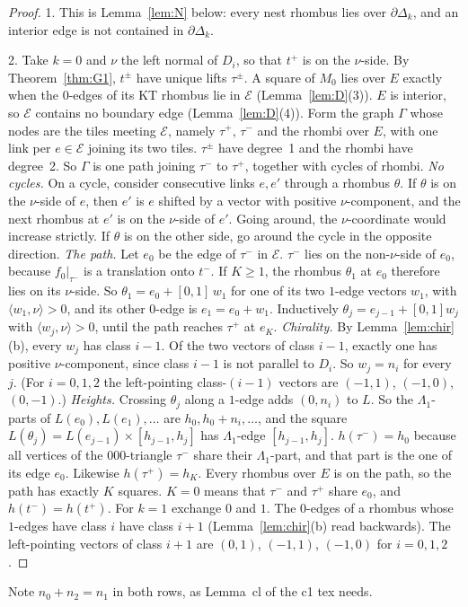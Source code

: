 \documentclass[11pt]{article}
\theoremstyle{definition}\newtheorem{definition}[theorem]{Definition}\newtheorem{remark}[theorem]{Remark}
\begin{document}
\begin{proof}
1. This is Lemma~\ref{lem:N} below: every nest rhombus lies over $\partial\Delta_k$, and an interior edge is not contained in $\partial\Delta_k$.

2. Take $k=0$ and $\nu$ the left normal of $D_i$, so that $t^+$ is on the $\nu$-side. By Theorem~\ref{thm:G1}, $t^\pm$ have unique lifts $\tau^\pm$. A square of $M_0$ lies over $E$ exactly when the $0$-edges of its KT rhombus lie in $\mathcal E$ (Lemma~\ref{lem:D}(3)). $E$ is interior, so $\mathcal E$ contains no boundary edge (Lemma~\ref{lem:D}(4)). Form the graph $\Gamma$ whose nodes are the tiles meeting $\mathcal E$, namely $\tau^+$, $\tau^-$ and the rhombi over $E$, with one link per $e\in\mathcal E$ joining its two tiles. $\tau^\pm$ have degree~1 and the rhombi have degree~2. So $\Gamma$ is one path joining $\tau^-$ to $\tau^+$, together with cycles of rhombi.
\emph{No cycles.} On a cycle, consider consecutive links $e,e'$ through a rhombus $\theta$. If $\theta$ is on the $\nu$-side of $e$, then $e'$ is $e$ shifted by a vector with positive $\nu$-component, and the next rhombus at $e'$ is on the $\nu$-side of $e'$. Going around, the $\nu$-coordinate would increase strictly. If $\theta$ is on the other side, go around the cycle in the opposite direction.
\emph{The path.} Let $e_0$ be the edge of $\tau^-$ in $\mathcal E$. $\tau^-$ lies on the non-$\nu$-side of $e_0$, because $f_0|_{\tau^-}$ is a translation onto $t^-$. If $K\ge1$, the rhombus $\theta_1$ at $e_0$ therefore lies on its $\nu$-side. So $\theta_1=e_0+[0,1]\,w_1$ for one of its two $1$-edge vectors $w_1$, with $\langle w_1,\nu\rangle>0$, and its other $0$-edge is $e_1=e_0+w_1$. Inductively $\theta_j=e_{j-1}+[0,1]w_j$ with $\langle w_j,\nu\rangle>0$, until the path reaches $\tau^+$ at $e_K$.
\emph{Chirality.} By Lemma~\ref{lem:chir}(b), every $w_j$ has class $i-1$. Of the two vectors of class $i-1$, exactly one has positive $\nu$-component, since class $i-1$ is not parallel to $D_i$. So $w_j=n_i$ for every $j$. (For $i=0,1,2$ the left-pointing class-$(i-1)$ vectors are $(-1,1)$, $(-1,0)$, $(0,-1)$.)
\emph{Heights.} Crossing $\theta_j$ along a $1$-edge adds $(0,n_i)$ to $L$. So the $\Lambda_1$-parts of $L(e_0),L(e_1),\dots$ are $h_0,h_0+n_i,\dots$, and the square $L(\theta_j)=L(e_{j-1})\times[h_{j-1},h_j]$ has $\Lambda_1$-edge $[h_{j-1},h_j]$. $h(\tau^-)=h_0$ because all vertices of the $000$-triangle $\tau^-$ share their $\Lambda_1$-part, and that part is the one of its edge $e_0$. Likewise $h(\tau^+)=h_K$. Every rhombus over $E$ is on the path, so the path has exactly $K$ squares. $K=0$ means that $\tau^-$ and $\tau^+$ share $e_0$, and $h(t^-)=h(t^+)$.
For $k=1$ exchange $0$ and $1$. The $0$-edges of a rhombus whose $1$-edges have class $i$ have class $i+1$ (Lemma~\ref{lem:chir}(b) read backwards). The left-pointing vectors of class $i+1$ are $(0,1)$, $(-1,1)$, $(-1,0)$ for $i=0,1,2$.
\end{proof}
\noindent Note $n_0+n_2=n_1$ in both rows, as Lemma~cl of the c1 tex needs.
\end{document}
